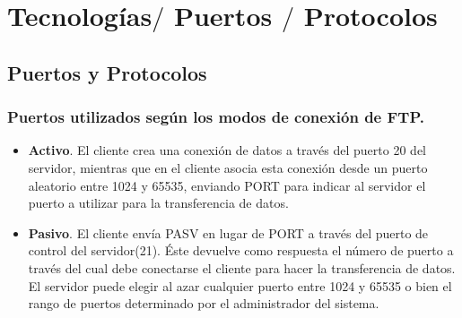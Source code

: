 \section{Tecnolog\'ias$/$ Puertos $/$ Protocolos}

\subsection{Puertos y Protocolos}
\begin{frame}
\normalsize
  	\frametitle{Puertos utilizados según los modos de conexión de FTP.}
  	\begin{itemize}
  	\item {\bf Activo}. El cliente crea una conexión de datos a través del puerto 20 del servidor, mientras que en el cliente asocia esta conexión desde un puerto aleatorio entre 1024 y 65535, enviando PORT para indicar al servidor el puerto a utilizar para la transferencia de datos.

  	\item {\bf Pasivo}. El cliente envía PASV en lugar de PORT a través del puerto de control del servidor(21). Éste devuelve como respuesta el número de puerto a través del cual debe conectarse el cliente para hacer la transferencia de datos. El servidor puede elegir al azar cualquier puerto entre 1024 y 65535 o bien el rango de puertos determinado por el administrador del sistema.
  	\end{itemize}
\end{frame}
